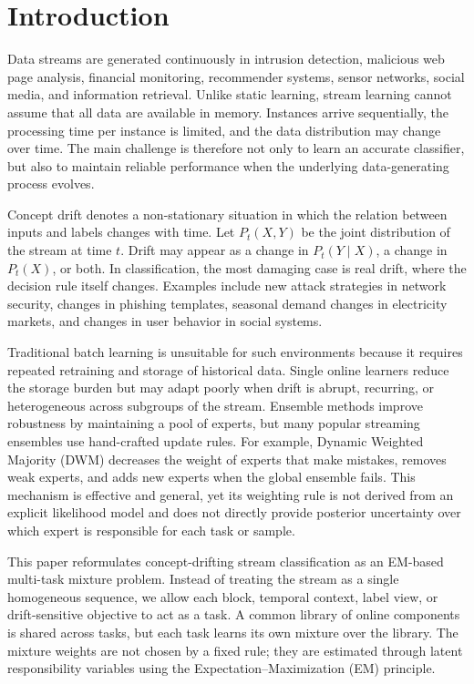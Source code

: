 ﻿\documentclass[12pt,a4paper]{article}
\begin{document}
\section{Introduction}
Data streams are generated continuously in intrusion detection, malicious web page analysis, financial monitoring, recommender systems, sensor networks, social media, and information retrieval. Unlike static learning, stream learning cannot assume that all data are available in memory. Instances arrive sequentially, the processing time per instance is limited, and the data distribution may change over time. The main challenge is therefore not only to learn an accurate classifier, but also to maintain reliable performance when the underlying data-generating process evolves.

Concept drift denotes a non-stationary situation in which the relation between inputs and labels changes with time. Let $P_t(X,Y)$ be the joint distribution of the stream at time $t$. Drift may appear as a change in $P_t(Y\mid X)$, a change in $P_t(X)$, or both. In classification, the most damaging case is real drift, where the decision rule itself changes. Examples include new attack strategies in network security, changes in phishing templates, seasonal demand changes in electricity markets, and changes in user behavior in social systems.

Traditional batch learning is unsuitable for such environments because it requires repeated retraining and storage of historical data. Single online learners reduce the storage burden but may adapt poorly when drift is abrupt, recurring, or heterogeneous across subgroups of the stream. Ensemble methods improve robustness by maintaining a pool of experts, but many popular streaming ensembles use hand-crafted update rules. For example, Dynamic Weighted Majority (DWM) decreases the weight of experts that make mistakes, removes weak experts, and adds new experts when the global ensemble fails. This mechanism is effective and general, yet its weighting rule is not derived from an explicit likelihood model and does not directly provide posterior uncertainty over which expert is responsible for each task or sample.

This paper reformulates concept-drifting stream classification as an EM-based multi-task mixture problem. Instead of treating the stream as a single homogeneous sequence, we allow each block, temporal context, label view, or drift-sensitive objective to act as a task. A common library of online components is shared across tasks, but each task learns its own mixture over the library. The mixture weights are not chosen by a fixed rule; they are estimated through latent responsibility variables using the Expectation--Maximization (EM) principle.
\end{document}
